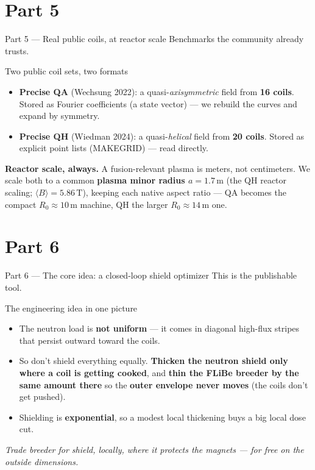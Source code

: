 \documentclass[11pt,aspectratio=169]{beamer}
\newcommand{\key}[1]{\textcolor{key}{\textbf{#1}}}
\newcommand{\qq}[1]{\begin{center}\emph{#1}\end{center}}
\begin{document}
\section{Part 5}
\begin{frame}{Part 5 --- Real public coils, at reactor scale}\Large
Benchmarks the community already trusts.\end{frame}

\begin{frame}{Two public coil sets, two formats}
\begin{itemize}
\item \key{Precise QA} (Wechsung 2022): a quasi-\emph{axisymmetric} field from
      \key{16 coils}. Stored as Fourier coefficients (a state vector) --- we rebuild the
      curves and expand by symmetry.
\item \key{Precise QH} (Wiedman 2024): a quasi-\emph{helical} field from \key{20 coils}.
      Stored as explicit point lists (MAKEGRID) --- read directly.
\end{itemize}
\key{Reactor scale, always.} A fusion-relevant plasma is meters, not centimeters. We scale
both to a common \key{plasma minor radius \(a=1.7\,\text{m}\)} (the QH reactor scaling; \(
\langle B\rangle=5.86\,\text{T}\)), keeping each native aspect ratio --- QA becomes the
compact \(R_0\approx10\,\text{m}\) machine, QH the larger \(R_0\approx14\,\text{m}\) one.
\end{frame}

\section{Part 6}
\begin{frame}{Part 6 --- The core idea: a closed-loop shield optimizer}\Large
This is the publishable tool.\end{frame}

\begin{frame}{The engineering idea in one picture}
\begin{itemize}
\item The neutron load is \key{not uniform} --- it comes in diagonal high-flux stripes that
      persist outward toward the coils.
\item So don't shield everything equally. \key{Thicken the neutron shield only where a coil
      is getting cooked}, and \key{thin the FLiBe breeder by the same amount there} so the
      \key{outer envelope never moves} (the coils don't get pushed).
\item Shielding is \key{exponential}, so a modest local thickening buys a big local dose cut.
\end{itemize}
\qq{Trade breeder for shield, locally, where it protects the magnets --- for free on the
outside dimensions.}
\end{frame}
\end{document}
